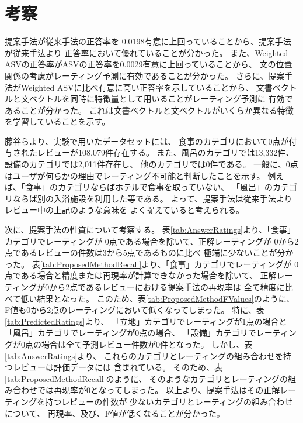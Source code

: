 \section{考察} \label{sec:Discussion}

提案手法が従来手法\cite{fujitani15}の正答率を
0.0198有意に上回っていることから、提案手法が従来手法\cite{fujitani15}より
正答率において優れていることが分かった。
また、Weighted ASVの正答率がASVの正答率を0.0029有意に上回っていることから、
文の位置関係の考慮がレーティング予測に有効であることが分かった。
さらに、提案手法がWeighted ASVに比べ有意に高い正答率を示していることから、
文書ベクトルと文ベクトルを同時に特徴量として用いることがレーティング予測に
有効であることが分かった。
これは文書ベクトルと文ベクトルがいくらか異なる特徴を学習していることを示す。

藤谷ら\cite{fujitani15}より、実験で用いたデータセットには、
食事のカテゴリにおいて0点が付与されたレビューが108,079件存在する。
また、風呂のカテゴリでは13,332件、設備のカテゴリでは2,011件存在し、
他のカテゴリでは0件である。
一般に、0点はユーザが何らかの理由でレーティング不可能と判断したことを示す。
例えば、「食事」のカテゴリならばホテルで食事を取っていない、
「風呂」のカテゴリならば別の入浴施設を利用した等である。
よって、提案手法は従来手法\cite{fujitani15}よりレビュー中の上記のような意味を
よく捉えていると考えられる。

次に、提案手法の性質について考察する。
%
表\ref{tab:AnswerRatings}より、「食事」カテゴリでレーティングが
0点である場合を除いて、正解レーティングが
0から2点であるレビューの件数は3から5点であるものに比べ
極端に少ないことが分かった。
表\ref{tab:ProposedMethodRecall}より、「食事」カテゴリでレーティングが
0点である場合と精度または再現率が計算できなかった場合を除いて、
正解レーティングが0から2点であるレビューにおける提案手法の再現率は
全て精度に比べて低い結果となった。
このため、表\ref{tab:ProposedMethodFValues}のように、
F値も0から2点のレーティングにおいて低くなってしまった。
%
特に、表\ref{tab:PredictedRatings}より、
「立地」カテゴリでレーティングが1点の場合と
「風呂」カテゴリでレーティングが0点の場合、
「設備」カテゴリでレーティングが0点の場合は全て予測レビュー件数が0件となった。
しかし、表\ref{tab:AnswerRatings}より、
これらのカテゴリとレーティングの組み合わせを持つレビューは評価データには
含まれている。
そのため、表\ref{tab:ProposedMethodRecall}のように、
そのようなカテゴリとレーティングの組み合わせでは再現率が0となってしまった。
%
以上より、提案手法はその正解レーティングを持つレビューの件数が
少ないカテゴリとレーティングの組み合わせについて、
再現率、及び、F値が低くなることが分かった。

